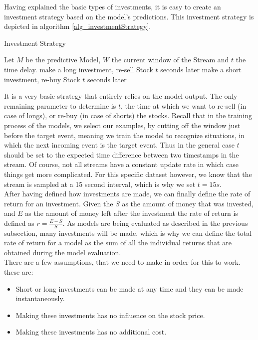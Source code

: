 Having explained the basic types of investments, it is easy to create an investment strategy based on the model's predictions. This investment strategy is depicted in algorithm \ref{alg_investmentStrategy}. 

\begin{algorithm}[H]
  \caption{Investment Strategy
    \label{alg_investmentStrategy}}
  \begin{algorithmic}[1]
    \Statex
    \Require Let $M$ be the predictive Model, $W$ the current window of the Stream and $t$ the time delay.
      		\State make a long investment, re-sell Stock $t$ seconds later
			\State make a short investment, re-buy Stock $t$ seconds later
       	\EndIf
    \EndFunction
  \end{algorithmic}
\end{algorithm}

It is a very basic strategy that entirely relies on the model output. The only remaining parameter to determine is $t$, the time at which we want to re-sell (in case of longs), or re-buy (in case of shorts) the stocks. Recall that in the training process of the models, we select our examples, by cutting off the window just before the target event, meaning we train the model to recognize situations, in which the next incoming event is the target event. Thus in the general case $t$ should be set to the expected time difference between two timestamps in the stream. Of course, not all streams have a constant update rate in which case things get more complicated. For this specific dataset however, we know that the stream is sampled at a 15 second interval, which is why we set $t = 15s$. \\
After having defined how investments are made, we can finally define the rate of return for an investment. Given the $S$ as the amount of money that was invested, and $E$ as the amount of money left after the investment the rate of return is defined as $r = \frac{E-S}{S}$. As models are being evaluated as described in the previous subsection, many investments will be made, which is why we can define the total rate of return for a model as the sum of all the individual returns that are obtained during the model evaluation.\\
There are a few assumptions, that we need to make in order for this to work. these are:

\begin{itemize}
	\item Short or long investments can be made at any time and they can be made instantaneously.
	\item Making these investments has no influence on the stock price.
	\item Making these investments has no additional cost.
\end{itemize}

